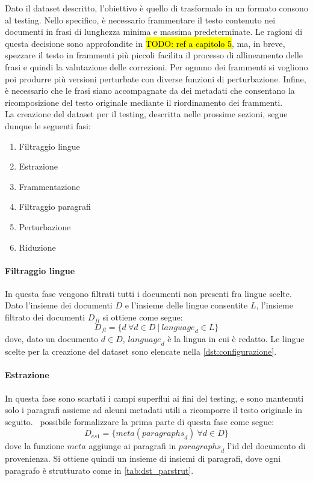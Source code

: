 Dato il dataset descritto, l'obiettivo è quello di trasformalo in un formato consono al testing. Nello specifico, è necessario frammentare il testo contenuto nei documenti in frasi di lunghezza minima e massima predeterminate. Le ragioni di questa decisione sono approfondite in \hl{TODO: ref a capitolo 5}, ma, in breve, spezzare il testo in frammenti più piccoli facilita il processo di allineamento delle frasi e quindi la valutazione delle correzioni. Per ognuno dei frammenti si vogliono poi produrre più versioni perturbate con diverse funzioni di perturbazione. Infine, è necessario che le frasi siano accompagnate da dei metadati che consentano la ricomposizione del testo originale mediante il riordinamento dei frammenti.\\
La creazione del dataset per il testing, descritta nelle prossime sezioni, segue dunque le seguenti fasi:
\begin{enumerate}
\item Filtraggio lingue
\item Estrazione
\item Frammentazione
\item Filtraggio paragrafi
\item Perturbazione
\item Riduzione
\end{enumerate}

\paragraph{Filtraggio lingue}
In questa fase vengono filtrati tutti i documenti non presenti fra lingue scelte. Dato l'insieme dei documenti $D$ e l'insieme delle lingue consentite $L$, l'insieme filtrato dei documenti $D_{fl}$ si ottiene come segue:
\begin{equation}
D_{fl} = \{d\ \forall d \in D\ |\ \textit{language}_d \in L  \} 
\end{equation}
dove, dato un documento $d \in D$, $\textit{language}_d$ è la lingua in cui è redatto. Le lingue scelte per la creazione del dataset sono elencate nella \autoref{dst:configurazione}.

\paragraph{Estrazione}
In questa fase sono scartati i campi superflui ai fini del testing, e sono mantenuti solo i paragrafi assieme ad alcuni metadati utili a ricomporre il testo originale in seguito. \E\ possibile formalizzare la prima parte di questa fase come segue:
\begin{equation}
D_{es1} = \{ meta({paragraphs}_d)\ \forall d \in D  \}
\end{equation}
dove la funzione $meta$ aggiunge ai paragrafi in ${paragraphs}_d$ l'id del documento di provenienza. Si ottiene quindi un insieme di insiemi di paragrafi, dove ogni paragrafo è strutturato come in \autoref{tab:dst_parstrut}.

